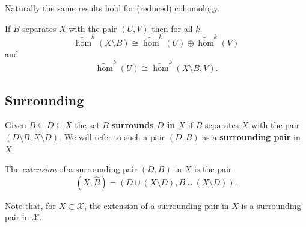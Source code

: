 Naturally the same results hold for (reduced) cohomology.

\begin{corollary}\label{cor:reduced_cohom}
  If $B$ separates $X$ with the pair $(U, V)$ then for all $k$
  \[ \tilde{\hom}^k(X\setminus B) \cong \tilde{\hom}^k(U)\oplus \tilde{\hom}^k(V) \]
  and
  \[\tilde{\hom}^k(U)\cong \tilde{\hom}^k(X\setminus B, V).\]
\end{corollary}

\subsection{Surrounding}

\begin{definition}[Surrounding]
  Given $B\subseteq D\subseteq X$ the set $B$ \textbf{surrounds $D$ in $X$} if $B$ separates $X$ with the pair $(D\setminus B, X\setminus D)$.
  We will refer to such a pair $(D, B)$ as a \textbf{surrounding pair} in $X$.
\end{definition}

\begin{definition}[Extension]
  The \emph{extension} of a surrounding pair $(D, B)$ in $X$ is the pair
  \[ (X, \hat{B}) = (D\cup (X\setminus D), B\cup (X\setminus D)).\]
\end{definition}

Note that, for $X\subset\mathcal{X}$, the extension of a surrounding pair in $X$ is a surrounding pair in $\mathcal{X}$.


